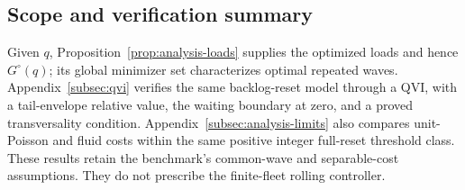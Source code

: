 \subsection{Scope and verification summary}

Given $q$, Proposition~\ref{prop:analysis-loads} supplies the optimized
loads and hence $G^\circ(q)$; its global minimizer set characterizes
optimal repeated waves. Appendix~\ref{subsec:qvi} verifies the same
backlog-reset model through a QVI, with a tail-envelope relative value,
the waiting boundary at zero, and a proved transversality condition.
Appendix~\ref{subsec:analysis-limits} also compares unit-Poisson and fluid
costs within the same positive integer full-reset threshold class.
These results retain the benchmark's common-wave and separable-cost
assumptions. They do not prescribe the finite-fleet rolling controller.
